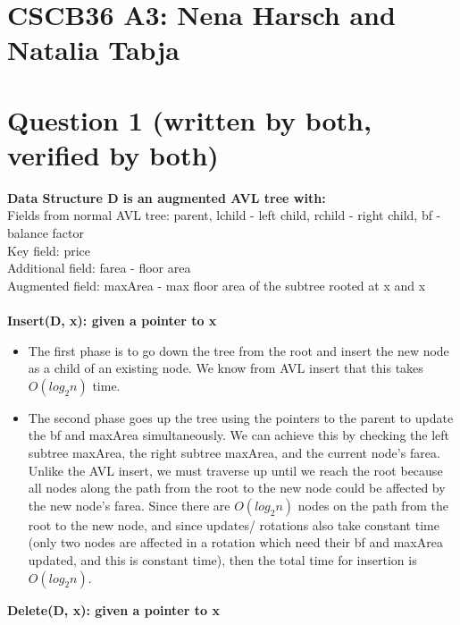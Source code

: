 \documentclass[11pt, a4paper]{article}
\begin{document}
\section*{CSCB36 A3: Nena Harsch and Natalia Tabja}
\section*{Question 1 (written by both, verified by both)}
\textbf{Data Structure D is an augmented AVL tree with:} \\
Fields from normal AVL tree: parent, lchild - left child, rchild - right child, bf - balance factor \\
Key field: price \\
Additional field: farea - floor area\\
Augmented field: maxArea - max floor area of the subtree rooted at x and x \\\\
\textbf{Insert(D, x): given a pointer to x} \\
\begin{itemize}
    \item The first phase is to go down the tree from the root and insert the new node as a child of an existing node. We know from AVL insert that this takes $O(log_2n)$ time.
    \item The second phase goes up the tree using the pointers to the parent to update the bf and maxArea simultaneously. We can achieve this by checking the left subtree maxArea, the right subtree maxArea, and the current node's farea. Unlike the AVL insert, we must traverse up until we reach the root because all nodes along the path from the root to the new node could be affected by the new node's farea. Since there are $O(log_2n)$ nodes on the path from the root to the new node, and since updates/ rotations also take constant time (only two nodes are affected in a rotation which need their bf and maxArea updated, and this is constant time), then the total time for insertion is $O(log_2n)$.
\end{itemize}
\textbf{Delete(D, x): given a pointer to x} \\
\end{document}
